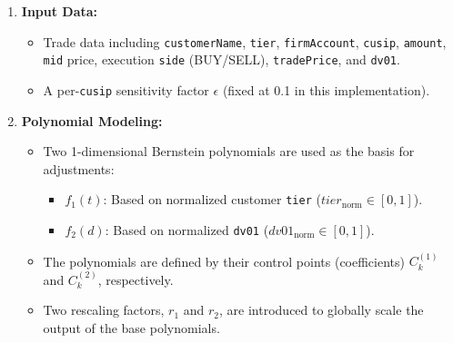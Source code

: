 \documentclass[11pt, a4paper]{article}
\begin{document}
\begin{enumerate}
    \item \textbf{Input Data:}
        \begin{itemize}[nosep] %
            \item Trade data including \texttt{customerName}, \texttt{tier}, \texttt{firmAccount}, \texttt{cusip}, \texttt{amount}, \texttt{mid} price, execution \texttt{side} (BUY/SELL), \texttt{tradePrice}, and \texttt{dv01}.
            \item A per-\texttt{cusip} sensitivity factor $\epsilon$ (fixed at 0.1 in this implementation).
        \end{itemize}

    \item \textbf{Polynomial Modeling:}
        \begin{itemize}[nosep]
            \item Two 1-dimensional Bernstein polynomials are used as the basis for adjustments:
                \begin{itemize}
                    \item $f_1(t)$: Based on normalized customer \texttt{tier} ($tier_{\text{norm}} \in [0, 1]$).
                    \item $f_2(d)$: Based on normalized \texttt{dv01} ($dv01_{\text{norm}} \in [0, 1]$).
                \end{itemize}
            \item The polynomials are defined by their control points (coefficients) $C^{(1)}_k$ and $C^{(2)}_k$, respectively.
            \item Two rescaling factors, $r_1$ and $r_2$, are introduced to globally scale the output of the base polynomials.
        \end{itemize}


\end{enumerate}
\end{document}
